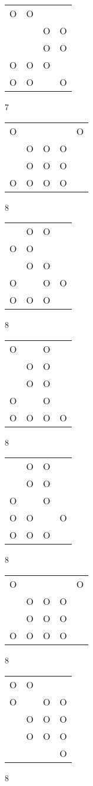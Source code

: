 \begin{tabular}{|m{0.2cm}m{0.2cm}m{0.2cm}m{0.2cm}|}\hline
O&O& & \\
 & &O&O\\
 & &O&O\\
O&O&O& \\
O&O& &O\\
\hline\end{tabular}7
\begin{tabular}{|m{0.2cm}m{0.2cm}m{0.2cm}m{0.2cm}m{0.2cm}|}\hline
O& & & &O\\
 &O&O&O& \\
 &O&O&O& \\
O&O&O&O& \\
\hline\end{tabular}8
\begin{tabular}{|m{0.2cm}m{0.2cm}m{0.2cm}m{0.2cm}|}\hline
 &O&O& \\
O&O& & \\
 &O&O& \\
O& &O&O\\
O&O&O& \\
\hline\end{tabular}8
\begin{tabular}{|m{0.2cm}m{0.2cm}m{0.2cm}m{0.2cm}|}\hline
O& &O& \\
 &O&O& \\
 &O&O& \\
O& &O& \\
O&O&O&O\\
\hline\end{tabular}8
\begin{tabular}{|m{0.2cm}m{0.2cm}m{0.2cm}m{0.2cm}|}\hline
 &O&O& \\
 &O&O& \\
O& &O& \\
O&O& &O\\
O&O&O& \\
\hline\end{tabular}8
\begin{tabular}{|m{0.2cm}m{0.2cm}m{0.2cm}m{0.2cm}m{0.2cm}|}\hline
O& & & &O\\
 &O&O&O& \\
 &O&O&O& \\
O&O&O&O& \\
\hline\end{tabular}8
\begin{tabular}{|m{0.2cm}m{0.2cm}m{0.2cm}m{0.2cm}|}\hline
O&O& & \\
O& &O&O\\
 &O&O&O\\
 &O&O&O\\
 & & &O\\
\hline\end{tabular}8
